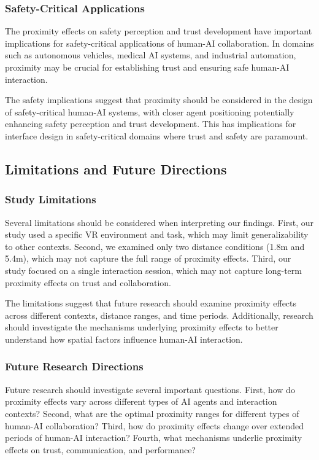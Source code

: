\documentclass[12pt]{article}
\begin{document}
\subsubsection{Safety-Critical Applications}

The proximity effects on safety perception and trust development have important implications for safety-critical applications of human-AI collaboration. In domains such as autonomous vehicles, medical AI systems, and industrial automation, proximity may be crucial for establishing trust and ensuring safe human-AI interaction.

The safety implications suggest that proximity should be considered in the design of safety-critical human-AI systems, with closer agent positioning potentially enhancing safety perception and trust development. This has implications for interface design in safety-critical domains where trust and safety are paramount.

\subsection{Limitations and Future Directions}

\subsubsection{Study Limitations}

Several limitations should be considered when interpreting our findings. First, our study used a specific VR environment and task, which may limit generalizability to other contexts. Second, we examined only two distance conditions (1.8m and 5.4m), which may not capture the full range of proximity effects. Third, our study focused on a single interaction session, which may not capture long-term proximity effects on trust and collaboration.

The limitations suggest that future research should examine proximity effects across different contexts, distance ranges, and time periods. Additionally, research should investigate the mechanisms underlying proximity effects to better understand how spatial factors influence human-AI interaction.

\subsubsection{Future Research Directions}

Future research should investigate several important questions. First, how do proximity effects vary across different types of AI agents and interaction contexts? Second, what are the optimal proximity ranges for different types of human-AI collaboration? Third, how do proximity effects change over extended periods of human-AI interaction? Fourth, what mechanisms underlie proximity effects on trust, communication, and performance?
\end{document}
